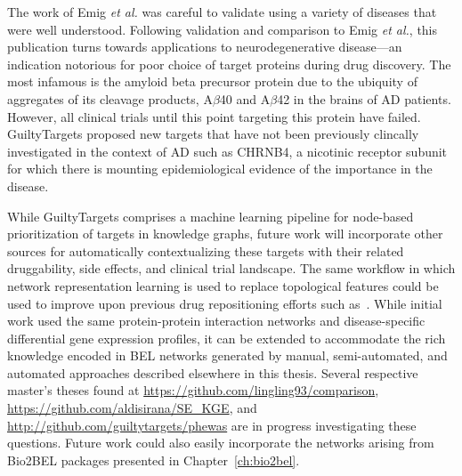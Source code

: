 The work of Emig \textit{et al.} was careful to validate using a variety of diseases that were well understood.
Following validation and comparison to Emig \textit{et al.}, this publication turns towards applications to neurodegenerative disease---an indication notorious for poor choice of target proteins during drug discovery.
The most infamous is the amyloid beta precursor protein due to the ubiquity of aggregates of its cleavage products, A$\beta$40 and A$\beta$42 in the brains of \ac{AD} patients.
However, all clinical trials until this point targeting this protein have failed.
GuiltyTargets proposed new targets that have not been previously clincally investigated in the context of \ac{AD} such as CHRNB4, a nicotinic receptor subunit for which there is mounting epidemiological evidence of the importance in the disease.

While GuiltyTargets comprises a machine learning pipeline for node-based prioritization of targets in knowledge graphs, future work will incorporate other sources for automatically contextualizing these targets with their related druggability, side effects, and clinical trial landscape.
The same workflow in which network representation learning is used to replace topological features could be used to improve upon previous drug repositioning efforts such as~\cite{Himmelstein2017}.
While initial work used the same protein-protein interaction networks and disease-specific differential gene expression profiles, it can be extended to accommodate the rich knowledge encoded in \ac{BEL} networks generated by manual, semi-automated, and automated approaches described elsewhere in this thesis.
Several respective master's theses found at \url{https://github.com/lingling93/comparison}, \url{https://github.com/aldisirana/SE_KGE}, and \url{http://github.com/guiltytargets/phewas} are in progress investigating these questions.
Future work could also easily incorporate the networks arising from Bio2BEL packages presented in Chapter~\ref{ch:bio2bel}.
